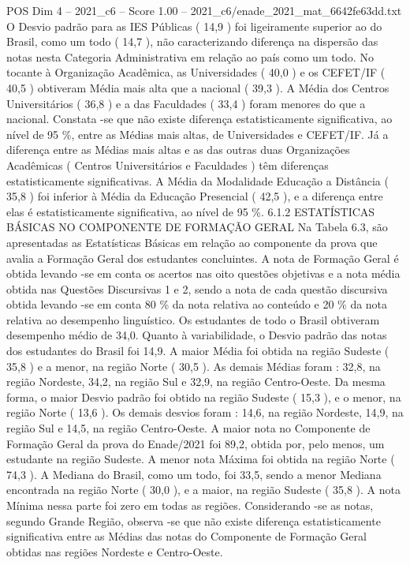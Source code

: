 \begin{textsample}{POS Dim 4 – 2021\_c6 – Score 1.00 – 2021\_c6/enade\_2021\_mat\_6642fe63dd.txt}
O Desvio padrão para as IES Públicas ( 14,9 ) foi ligeiramente superior ao do Brasil, como um todo ( 14,7 ), não caracterizando diferença na dispersão das notas nesta Categoria Administrativa em relação ao país como um todo.
No tocante à Organização Acadêmica, as Universidades ( 40,0 ) e os CEFET/IF ( 40,5 ) obtiveram Média mais alta que a nacional ( 39,3 ).
A Média dos Centros Universitários ( 36,8 ) e a das Faculdades ( 33,4 ) foram menores do que a nacional.
Constata -se que não existe diferença estatisticamente significativa, ao nível de 95 \%, entre as Médias mais altas, de Universidades e CEFET/IF.
Já a diferença entre as Médias mais altas e as das outras duas Organizações Acadêmicas ( Centros Universitários e Faculdades ) têm diferenças estatisticamente significativas.
A Média da Modalidade Educação a Distância ( 35,8 ) foi inferior à Média da Educação Presencial ( 42,5 ), e a diferença entre elas é estatisticamente significativa, ao nível de 95 \%. 6.1.2 ESTATÍSTICAS BÁSICAS NO COMPONENTE DE FORMAÇÃO GERAL Na Tabela 6.3, são apresentadas as Estatísticas Básicas em relação ao componente da prova que avalia a Formação Geral dos estudantes concluintes.
A nota de Formação Geral é obtida levando -se em conta os acertos nas oito questões objetivas e a nota média obtida nas Questões Discursivas 1 e 2, sendo a nota de cada questão discursiva obtida levando -se em conta 80 \% da nota relativa ao conteúdo e 20 \% da nota relativa ao desempenho linguístico.
Os estudantes de todo o Brasil obtiveram desempenho médio de 34,0.
Quanto à variabilidade, o Desvio padrão das notas dos estudantes do Brasil foi 14,9.
A maior Média foi obtida na região Sudeste ( 35,8 ) e a menor, na região Norte ( 30,5 ).
As demais Médias foram : 32,8, na região Nordeste, 34,2, na região Sul e 32,9, na região Centro-Oeste.
Da mesma forma, o maior Desvio padrão foi obtido na região Sudeste ( 15,3 ), e o menor, na região Norte ( 13,6 ).
Os demais desvios foram : 14,6, na região Nordeste, 14,9, na região Sul e 14,5, na região Centro-Oeste.
A maior nota no Componente de Formação Geral da prova do Enade/2021 foi 89,2, obtida por, pelo menos, um estudante na região Sudeste.
A menor nota Máxima foi obtida na região Norte ( 74,3 ).
A Mediana do Brasil, como um todo, foi 33,5, sendo a menor Mediana encontrada na região Norte ( 30,0 ), e a maior, na região Sudeste ( 35,8 ).
A nota Mínima nessa parte foi zero em todas as regiões.
Considerando -se as notas, segundo Grande Região, observa -se que não existe diferença estatisticamente significativa entre as Médias das notas do Componente de Formação Geral obtidas nas regiões Nordeste e Centro-Oeste.

\end{textsample}
